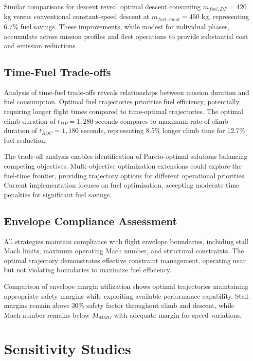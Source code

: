 Similar comparisons for descent reveal optimal descent consuming $m_{fuel,DP} = 420$ kg versus conventional constant-speed descent at $m_{fuel,const} = 450$ kg, representing 6.7\% fuel savings. These improvements, while modest for individual phases, accumulate across mission profiles and fleet operations to provide substantial cost and emission reductions.

\subsection{Time-Fuel Trade-offs}

Analysis of time-fuel trade-offs reveals relationships between mission duration and fuel consumption. Optimal fuel trajectories prioritize fuel efficiency, potentially requiring longer flight times compared to time-optimal trajectories. The optimal climb duration of $t_{DP} = 1,280$ seconds compares to maximum rate of climb duration of $t_{ROC} = 1,180$ seconds, representing 8.5\% longer climb time for 12.7\% fuel reduction.

The trade-off analysis enables identification of Pareto-optimal solutions balancing competing objectives. Multi-objective optimization extensions could explore the fuel-time frontier, providing trajectory options for different operational priorities. Current implementation focuses on fuel optimization, accepting moderate time penalties for significant fuel savings.

\subsection{Envelope Compliance Assessment}

All strategies maintain compliance with flight envelope boundaries, including stall Mach limits, maximum operating Mach number, and structural constraints. The optimal trajectory demonstrates effective constraint management, operating near but not violating boundaries to maximize fuel efficiency.

Comparison of envelope margin utilization shows optimal trajectories maintaining appropriate safety margins while exploiting available performance capability. Stall margins remain above 30\% safety factor throughout climb and descent, while Mach number remains below $M_{MMO}$ with adequate margin for speed variations.

\section{Sensitivity Studies}

